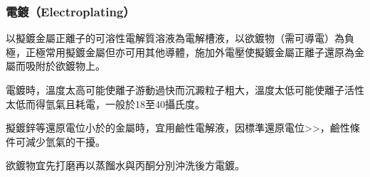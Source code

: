 \documentclass[a4paper,12pt]{article}
\begin{document}
\subsubsection{電鍍（Electroplating）}
以擬鍍金屬正離子的可溶性電解質溶液為電解槽液，以欲鍍物（需可導電）為負極，正極常用擬鍍金屬但亦可用其他導體，施加外電壓使擬鍍金屬正離子還原為金屬而吸附於欲鍍物上。

電鍍時，溫度太高可能使離子游動過快而沉澱粒子粗大，溫度太低可能使離子活性太低而得氫氣且耗電，一般於18至40攝氏度。

擬鍍鋅等還原電位小於的金屬時，宜用鹼性電解液，因標準還原電位>>，鹼性條件可減少氫氣的干擾。

欲鍍物宜先打磨再以蒸餾水與丙酮分別沖洗後方電鍍。
\end{document}
